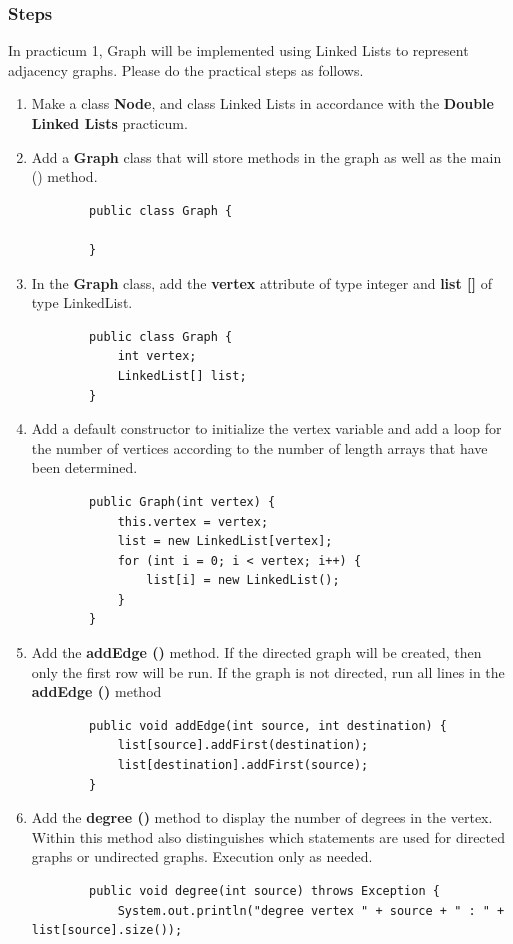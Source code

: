 \documentclass[12pt,titlepage]{article}
\begin{document}
\subsubsection{Steps}
In practicum 1, Graph will be implemented using Linked Lists to represent adjacency graphs. Please do the practical steps as follows.
\begin{enumerate}
    \item Make a class \textbf{Node}, and class Linked Lists in accordance with the \textbf{Double Linked Lists} practicum.
    \item Add a \textbf{Graph} class that will store methods in the graph as well as the main () method.
    \begin{verbatim}
        public class Graph {
        
        }
    \end{verbatim}
    \item In the \textbf{Graph} class, add the \textbf{vertex} attribute of type integer and \textbf{list []} of type LinkedList.
    \begin{verbatim}
        public class Graph {
            int vertex;
            LinkedList[] list;
        }
    \end{verbatim}
    \item Add a default constructor to initialize the vertex variable and add a loop for the number of vertices according to the number of length arrays that have been determined.
    \begin{verbatim}
        public Graph(int vertex) {
            this.vertex = vertex;
            list = new LinkedList[vertex];
            for (int i = 0; i < vertex; i++) {
                list[i] = new LinkedList();
            }
        }
    \end{verbatim}
    \item Add the \textbf{addEdge ()} method. If the directed graph will be created, then only the first row will be run. If the graph is not directed, run all lines in the \textbf{addEdge ()} method
    \begin{verbatim}
        public void addEdge(int source, int destination) {
            list[source].addFirst(destination);
            list[destination].addFirst(source);
        }
    \end{verbatim}
    \item Add the \textbf{degree ()} method to display the number of degrees in the vertex. Within this method also distinguishes which statements are used for directed graphs or undirected graphs. Execution only as needed.
    \begin{verbatim}
        public void degree(int source) throws Exception {
            System.out.println("degree vertex " + source + " : " + list[source].size());


\end{verbatim}
\end{enumerate}
\end{document}
